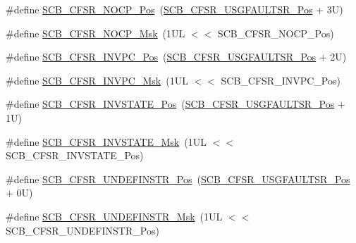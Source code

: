 \begin{DoxyCompactItemize}
\item 
\#define \mbox{\hyperlink{group___c_m_s_i_s___s_c_b_ga769b841a38d4e7b8c5e7e74cf0455754}{S\+C\+B\+\_\+\+C\+F\+S\+R\+\_\+\+N\+O\+C\+P\+\_\+\+Pos}}~(\mbox{\hyperlink{group___c_m_s_i_s___s_c_b_gac8e4197b295c8560e68e2d71285c7879}{S\+C\+B\+\_\+\+C\+F\+S\+R\+\_\+\+U\+S\+G\+F\+A\+U\+L\+T\+S\+R\+\_\+\+Pos}} + 3\+U)
\item 
\#define \mbox{\hyperlink{group___c_m_s_i_s___s_c_b_ga6cbafe22a9550ca20427cd7e2f2bed7f}{S\+C\+B\+\_\+\+C\+F\+S\+R\+\_\+\+N\+O\+C\+P\+\_\+\+Msk}}~(1\+U\+L $<$$<$ S\+C\+B\+\_\+\+C\+F\+S\+R\+\_\+\+N\+O\+C\+P\+\_\+\+Pos)
\item 
\#define \mbox{\hyperlink{group___c_m_s_i_s___s_c_b_ga526d3cebe0e96962941e5e3a729307c2}{S\+C\+B\+\_\+\+C\+F\+S\+R\+\_\+\+I\+N\+V\+P\+C\+\_\+\+Pos}}~(\mbox{\hyperlink{group___c_m_s_i_s___s_c_b_gac8e4197b295c8560e68e2d71285c7879}{S\+C\+B\+\_\+\+C\+F\+S\+R\+\_\+\+U\+S\+G\+F\+A\+U\+L\+T\+S\+R\+\_\+\+Pos}} + 2\+U)
\item 
\#define \mbox{\hyperlink{group___c_m_s_i_s___s_c_b_gafd7f0192bfedbde5d313fe7e637f55f1}{S\+C\+B\+\_\+\+C\+F\+S\+R\+\_\+\+I\+N\+V\+P\+C\+\_\+\+Msk}}~(1\+U\+L $<$$<$ S\+C\+B\+\_\+\+C\+F\+S\+R\+\_\+\+I\+N\+V\+P\+C\+\_\+\+Pos)
\item 
\#define \mbox{\hyperlink{group___c_m_s_i_s___s_c_b_ga85ecc14a387d790129e9a3fb1312407a}{S\+C\+B\+\_\+\+C\+F\+S\+R\+\_\+\+I\+N\+V\+S\+T\+A\+T\+E\+\_\+\+Pos}}~(\mbox{\hyperlink{group___c_m_s_i_s___s_c_b_gac8e4197b295c8560e68e2d71285c7879}{S\+C\+B\+\_\+\+C\+F\+S\+R\+\_\+\+U\+S\+G\+F\+A\+U\+L\+T\+S\+R\+\_\+\+Pos}} + 1\+U)
\item 
\#define \mbox{\hyperlink{group___c_m_s_i_s___s_c_b_ga8088a459ac3900a43a54f5cd4252484d}{S\+C\+B\+\_\+\+C\+F\+S\+R\+\_\+\+I\+N\+V\+S\+T\+A\+T\+E\+\_\+\+Msk}}~(1\+U\+L $<$$<$ S\+C\+B\+\_\+\+C\+F\+S\+R\+\_\+\+I\+N\+V\+S\+T\+A\+T\+E\+\_\+\+Pos)
\item 
\#define \mbox{\hyperlink{group___c_m_s_i_s___s_c_b_ga28219a6a1ae6b6118ffd1682c362c63d}{S\+C\+B\+\_\+\+C\+F\+S\+R\+\_\+\+U\+N\+D\+E\+F\+I\+N\+S\+T\+R\+\_\+\+Pos}}~(\mbox{\hyperlink{group___c_m_s_i_s___s_c_b_gac8e4197b295c8560e68e2d71285c7879}{S\+C\+B\+\_\+\+C\+F\+S\+R\+\_\+\+U\+S\+G\+F\+A\+U\+L\+T\+S\+R\+\_\+\+Pos}} + 0\+U)
\item 
\#define \mbox{\hyperlink{group___c_m_s_i_s___s_c_b_ga96e201c8da2bd76df35e184f31b89f1e}{S\+C\+B\+\_\+\+C\+F\+S\+R\+\_\+\+U\+N\+D\+E\+F\+I\+N\+S\+T\+R\+\_\+\+Msk}}~(1\+U\+L $<$$<$ S\+C\+B\+\_\+\+C\+F\+S\+R\+\_\+\+U\+N\+D\+E\+F\+I\+N\+S\+T\+R\+\_\+\+Pos)
\item 

\end{DoxyCompactItemize}
